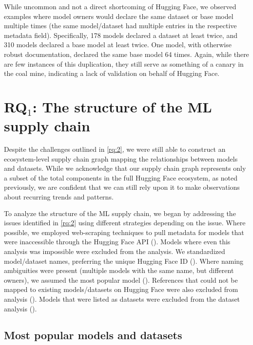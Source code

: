 While uncommon and not a direct shortcoming of Hugging Face, we observed examples where model owners would declare the same dataset or base model multiple times (\ie the same model/dataset had multiple entries in the respective metadata field). Specifically, 178 models declared a dataset at least twice, and 310 models declared a base model at least twice.  One model, with otherwise robust documentation, declared the same base model 64 times. Again, while there are few instances of this duplication, they still serve as something of a canary in the coal mine, indicating a lack of validation on behalf of Hugging Face.


\section{RQ$_1$: The structure of the ML supply chain}
\label{sec:rq1}



Despite the challenges outlined in \ref{rq:2}, we were still able to construct an ecosystem-level supply chain graph mapping the relationships between models and datasets. While we acknowledge that our supply chain graph represents only a subset of the total components %
in the full Hugging Face ecosystem, as noted previously, we are confident that we can still rely upon it to make observations about recurring trends and patterns. %


To analyze the structure of the ML supply chain, we began by addressing the issues identified in \ref{rq:2} using different strategies depending on the issue. %
Where possible, we employed web-scraping techniques to pull metadata for models that were inaccessible through the Hugging Face API ().  Models where even this analysis was impossible were excluded from the analysis.  We standardized model/dataset names, preferring the unique Hugging Face ID ().  Where naming ambiguities were present (multiple models with the same name, but different owners), we assumed the most popular model ().  References that could not be mapped to existing models/datasets on Hugging Face were also excluded from analysis ().  Models that were listed as datasets were excluded from the dataset analysis (). %

\subsection{Most popular models and datasets}

